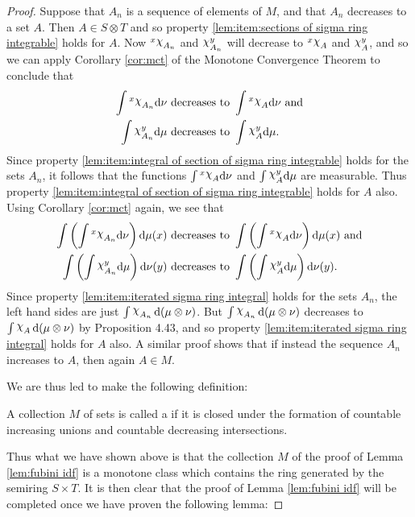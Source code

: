 \begin{proof}
Suppose that $A_n$ is a sequence of elements of $M$, and that $A_n$ decreases to a set $A$. Then $A\in S\otimes T$ and so property \ref{lem:item:sections of sigma ring integrable} holds for $A$. Now $\xsec{\idf{A_n}}{x}$ and $\ysec{\idf{A_n}}{y}$ will decrease to $\xsec{\idf{A}}{x}$ and $\ysec{\idf{A}}{y}$, and so we can apply Corollary \ref{cor:mct} of the Monotone Convergence Theorem to conclude that
\begin{align*}
\int\xsec{\idf{A_n}}{x}\dd\nu&\text { decreases to }\int\xsec{\idf{A}}{x}\dd\nu\text{ and}\\
\int\ysec{\idf{A_n}}{y}\dd\mu&\text { decreases to }\int\ysec{\idf{A}}{y}\dd\mu.
\end{align*}
Since property \ref{lem:item:integral of section of sigma ring integrable} holds for the sets $A_n$, it follows that the functions $\int\xsec{\idf{A}}{x}\dd\nu$ and $\int\ysec{\idf{A}}{y}\dd\mu$ are measurable. Thus property \ref{lem:item:integral of section of sigma ring integrable} holds for $A$ also. Using Corollary \ref{cor:mct} again, we see that
\begin{align*}
\int\br{\int\xsec{\idf{A_n}}{x}\dd\nu}\dd\mu(x)&\text { decreases to }\int\br{\int\xsec{\idf{A}}{x}\dd\nu}\dd\mu(x)\text{ and}\\
\int\br{\int\ysec{\idf{A_n}}{y}\dd\mu}\dd\nu(y)&\text { decreases to }\int\br{\int\ysec{\idf{A}}{y}\dd\mu}\dd\nu(y).
\end{align*}
Since property \ref{lem:item:iterated sigma ring integral} holds for the sets $A_n$, the left hand sides are just $\int\idf{A_n}\dd(\mu\otimes\nu)$. But $\int\idf{A_n}\dd(\mu\otimes\nu)$ decreases to $\int\idf{A}\dd(\mu\otimes\nu)$ by Proposition 4.43, and so property \ref{lem:item:iterated sigma ring integral} holds for $A$ also. A similar proof shows that if instead the sequence $A_n$ increases to $A$, then again $A\in M$.

We are thus led to make the following definition:

\begin{definition}
A collection $M$ of sets is called a  if it is closed under the formation of countable increasing unions and countable decreasing intersections.
\end{definition}

Thus what we have shown above is that the collection $M$ of the proof of Lemma \ref{lem:fubini idf} is a monotone class which contains the ring generated by the semiring $S\times T$. It is then clear that the proof of Lemma \ref{lem:fubini idf} will be completed once we have proven the following lemma:


\end{proof}
